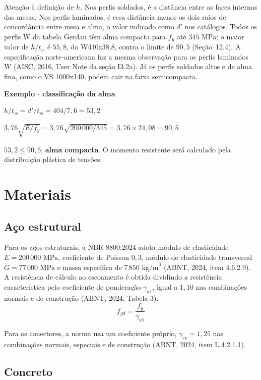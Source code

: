 \documentclass[11pt,a4paper]{article}
\newcommand{\caixaexemplo}[2]{%
  \par\vspace{6pt}\noindent\colorbox{examplebg}{%
    \parbox{\dimexpr\linewidth-2\fboxsep\relax}{%
      \vspace{4pt}\textbf{\color{exampleaccent}#1}\par\vspace{3pt}#2\vspace{4pt}%
    }%
  }\par\vspace{6pt}%
}
\begin{document}
Atenção à definição de $h$. Nos perfis soldados, é a distância entre as faces internas das mesas. Nos perfis laminados, é essa distância menos os dois raios de concordância entre mesa e alma, o valor indicado como $d'$ nos catálogos. Todos os perfis W da tabela Gerdau têm alma compacta para $f_y$ até $345\text{ MPa}$: o maior valor de $h/t_w$ é $55{,}8$, do W410x38,8, contra o limite de $90{,}5$ (Seção~12.4). A especificação norte-americana faz a mesma observação para os perfis laminados W (AISC, 2016, User Note da seção I3.2a). Já os perfis soldados altos e de alma fina, como o VS 1000x140, podem cair na faixa semicompacta.

\caixaexemplo{Exemplo $\cdot$ classificação da alma}{%
$h/t_w = d'/t_w = 404/7{,}6 = 53{,}2$\par
$3{,}76\sqrt{E/f_y} = 3{,}76\sqrt{200\,000/345} = 3{,}76 \times 24{,}08 = 90{,}5$\par
$53{,}2 \le 90{,}5$: \textbf{alma compacta}. O momento resistente será calculado pela distribuição plástica de tensões.}

\section{Materiais}

\subsection{Aço estrutural}

Para os aços estruturais, a NBR 8800:2024 adota módulo de elasticidade $E = 200\,000\text{ MPa}$, coeficiente de Poisson $0{,}3$, módulo de elasticidade transversal $G = 77\,000\text{ MPa}$ e massa específica de $7\,850\text{ kg/m}^3$ (ABNT, 2024, item 4.6.2.9). A resistência de cálculo ao escoamento é obtida dividindo a resistência característica pelo coeficiente de ponderação $\gamma_{a1}$, igual a $1{,}10$ nas combinações normais e de construção (ABNT, 2024, Tabela 3).
\begin{equation}
  f_{yd} = \frac{f_y}{\gamma_{a1}}
  \label{eq:fyd}
\end{equation}

Para os conectores, a norma usa um coeficiente próprio, $\gamma_{cs} = 1{,}25$ nas combinações normais, especiais e de construção (ABNT, 2024, item L.4.2.1.1).

\subsection{Concreto}
\end{document}

